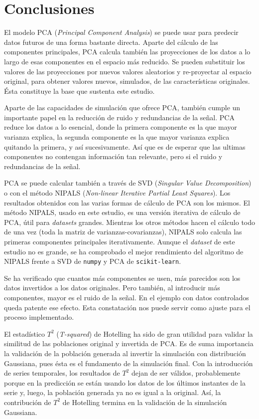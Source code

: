 \documentclass[11pt,spanish,listoffigures,listoftables]{tfgetsinf}
\begin{document}
 
\chapter{Conclusiones}

El modelo PCA ({\em Principal Component Analysis}) se puede usar para predecir datos futuros de una forma bastante directa. Aparte del cálculo de las componentes principales, PCA calcula también las proyecciones de los datos a lo largo de esas componentes en el espacio más reducido. Se pueden substituir los valores de las proyecciones por nuevos valores aleatorios y re-proyectar al espacio original, para obtener valores nuevos, simulados, de las características originales. Ésta constituye la base que sustenta este estudio.

Aparte de las capacidades de simulación que ofrece PCA, también cumple un importante papel en la reducción de ruido y redundancias de la señal. PCA reduce los datos a lo esencial, donde la primera componente es la que mayor varianza explica, la segunda componente es la que mayor varianza explica quitando la primera, y así sucesivamente. Así que es de esperar que las ultimas componentes no contengan información tan relevante, pero si el ruido y redundancias de la señal. 

PCA se puede calcular también a través de SVD ({\em Singular Value Decomposition}) o con el método NIPALS ({\em Non-linear Iterative Partial Least Squares}). Los resultados obtenidos con las varias formas de cálculo de PCA son los mismos. El método NIPALS, usado en este estudio, es una versión iterativa de cálculo de PCA, útil para {\em datasets} grandes. Mientras los otros métodos hacen el cálculo todo de una vez (toda la matriz de varianzas-covarianzas), NIPALS solo calcula las primeras componentes principales iterativamente. Aunque el {\em dataset} de este estudio no es grande, se ha comprobado el mejor rendimiento del algoritmo de NIPALS frente a SVD de {\tt numpy} y PCA de {\tt scikit-learn}.

Se ha verificado que cuantos más componentes se usen, más parecidos son los datos invertidos a los datos originales. Pero también, al introducir más componentes, mayor es el ruido de la señal. En el ejemplo con datos controlados queda patente ese efecto. Esta constatación nos puede servir como ajuste para el proceso implementado.

El estadístico \(T^2\) ({\em T-squared}) de Hotelling ha sido de gran utilidad para validar la similitud de las poblaciones original y invertida de PCA. Es de suma importancia la validación de la población generada al invertir la simulación con distribución Gaussiana, pues ésta es el fundamento de la simulación final. Con la introducción de series temporales, los resultados de \(T^2\) dejan de ser válidos, probablemente porque en la predicción se están usando los datos de los últimos instantes de la serie y, luego, la población generada ya no es igual a la original. Así, la contribución de \(T^2\) de Hotelling termina en la validación de la simulación Gaussiana.
\end{document}
